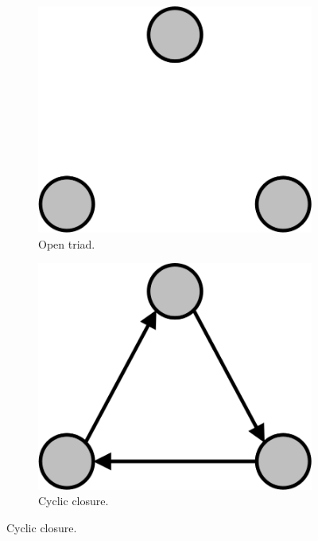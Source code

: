 \begin{figure}[hbt!]
\centering
\begin{subfigure}[b]{0.25\textwidth}
\includegraphics[width = \textwidth]{Images/Open_Triad.png}
\caption{Open triad.}
\end{subfigure}
\hspace{2em}
\begin{subfigure}[b]{0.25\textwidth}
\includegraphics[width = \textwidth]{Images/C_Closure.png}
\caption{Cyclic closure.}
\end{subfigure}
\hspace{2em}

\end{figure}
